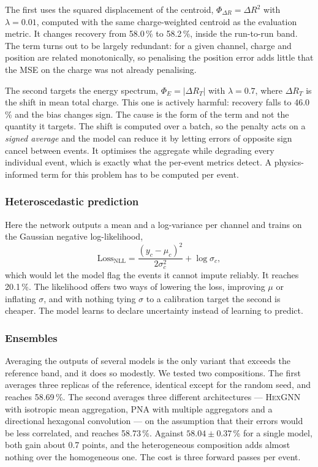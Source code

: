 \documentclass[10pt,conference]{IEEEtran}
\begin{document}
The first uses the squared displacement of the centroid,
$\Phi_{\Delta R} = \Delta R^{2}$ with $\lambda = 0.01$, computed with the same
charge-weighted centroid as the evaluation metric. It changes recovery from
58.0\,\% to 58.2\,\%, inside the run-to-run band. The term turns out to be
largely redundant: for a given channel, charge and position are related
monotonically, so penalising the position error adds little that the MSE on the
charge was not already penalising.

The second targets the energy spectrum, $\Phi_{E} = \lvert \Delta R_{T} \rvert$
with $\lambda = 0.7$, where $\Delta R_{T}$ is the shift in mean total charge.
This one is actively harmful: recovery falls to 46.0\,\% and the bias changes
sign. The cause is the form of the term and not the quantity it targets. The
shift is computed over a batch, so the penalty acts on a \emph{signed average}
and the model can reduce it by letting errors of opposite sign cancel between
events. It optimises the aggregate while degrading every individual event, which
is exactly what the per-event metrics detect. A physics-informed term for this
problem has to be computed per event.

\subsubsection{Heteroscedastic prediction}
Here the network outputs a mean and a log-variance per channel and trains on the
Gaussian negative log-likelihood,
%
\begin{equation}
\mathrm{Loss}_{\mathrm{NLL}} = \frac{(y_{c} - \mu_{c})^{2}}{2\sigma_{c}^{2}}
                             + \log \sigma_{c},
\label{eq:nll}
\end{equation}
%
which would let the model flag the events it cannot impute reliably. It reaches
20.1\,\%. The likelihood offers two ways of lowering the loss, improving $\mu$
or inflating $\sigma$, and with nothing tying $\sigma$ to a calibration target
the second is cheaper. The model learns to declare uncertainty instead of
learning to predict.

\subsubsection{Ensembles}
Averaging the outputs of several models is the only variant that exceeds the
reference band, and it does so modestly. We tested two compositions. The first
averages three replicas of the reference, identical except for the random seed,
and reaches 58.69\,\%. The second averages three different architectures ---
\textsc{HexGNN} with isotropic mean aggregation, PNA with multiple aggregators
and a directional hexagonal convolution --- on the assumption that their errors
would be less correlated, and reaches 58.73\,\%. Against $58.04 \pm 0.37$\,\%
for a single model, both gain about 0.7 points, and the heterogeneous
composition adds almost nothing over the homogeneous one. The cost is three
forward passes per event.
\end{document}
